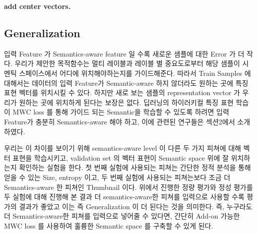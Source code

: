 \textbf{add center vectors. } 



\subsection{Generalization}
입력 Feature 가 Semantics-aware feature 일 수록 새로운 샘플에 대한 Error 가 더 작다. 우리가 제안한 목적함수는 멀티 레이블과 레이블 별 중요도로부터 해당 샘플이 시멘틱 스페이스에서 어디에 위치해야하는지를 가이드해준다. 따라서 Train Samples 에 대해서는 데이터의 입력 Feature가 Semantic-aware 하지 않더라도 원하는 곳에 특징 표현 벡터를 위치시킬 수 있다. 하지만 새로 보는 샘플의 representation vector 가 우리가 원하는 곳에 위치하게 된다는 보장은 없다. 딥러닝의 하이러키컬 특징 표현 학습이 MWC loss 를 통해 가이드 되는 Semantic을 학습할 수 있도록 하려면 입력 Feature가 충분히 Semantics-aware 해야 하고, 이에 관련된 연구들은 섹션2에서 소개하였다. 

우리는 이 차이를 보이기 위해 semantics-aware level 이 다른 두 가지 피쳐에 대해 벡터 표현을 학습시키고, validation set 의 벡터 표현이 Semantic space 위에 잘 위치하는지 확인하는 실험을 한다. 첫 번째 실험에 사용되는 피쳐는 간단한 정적 분석을 통해 얻을 수 있는 Size, entropy\citep{} 이고, 두 번째 실험에 사용되는 피쳐는보다 조금 더 Semantics-aware 한 피쳐인 Thumbnail\citep{} 이다. 위에서 진행한 정량 평가와 정성 평가를 두 실험에 대해 진행해 본 결과 더 semantics-aware한 피쳐를 입력으로 사용할 수록 평가의 결과가 좋았고 이는 즉 Generalization 이 더 된다는 것을 의미한다. 즉, 누구라도 더 Semantics-aware한 피쳐를 입력으로 넣어줄 수 있다면, 간단히 Add-on 가능한 MWC loss 를 사용하여 훌륭한 Semantic space 를 구축할 수 있게 된다. 


